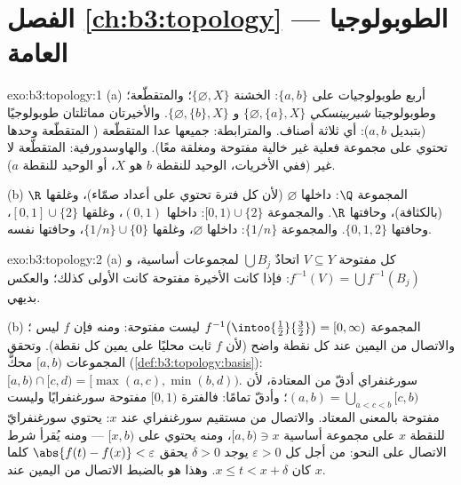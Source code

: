 \section*{الفصل \ref{ch:b3:topology} --- الطوبولوجيا العامة}

\begin{solution}{exo:b3:topology:1}
(a) أربع طوبولوجيات على $\{a,b\}$: الخشنة $\{\varnothing, X\}$؛ والمتقطّعة؛
وطوبولوجيتا \emph{شيربينسكي} $\{\varnothing, \{a\}, X\}$ و $\{\varnothing,
\{b\}, X\}$. والأخيرتان مماثلتان
طوبولوجيًا (بتبديل $a, b$): أي ثلاثة أصناف. والمترابطة: جميعها
عدا المتقطّعة ( المتقطّعة وحدها تحتوي على مجموعة
فعلية غير خالية مفتوحة ومغلقة معًا). والهاوسدورفية: المتقطّعة
لا غير (ففي الأخريات،  الوحيد للنقطة $b$ هو $X$، أو
 الوحيد للنقطة $a$).

(b) المجموعة $\Q$: داخلها $\varnothing$ (لأن كل فترة تحتوي على
أعداد صمّاء)، وغلقها $\R$ (بالكثافة)، وحافتها $\R$. والمجموعة
$[0,1)
\cup \{2\}$: داخلها $(0,1)$، وغلقها $[0,1]\cup\{2\}$، وحافتها
$\{0, 1, 2\}$. والمجموعة $\{1/n\}$: داخلها $\varnothing$،
وغلقها $\{1/n\}\cup\{0\}$، وحافتها  نفسه.
\end{solution}

\begin{solution}{exo:b3:topology:2}
(a) كل مفتوحة $V \subseteq Y$ اتحادٌ $\bigcup B_j$ لمجموعات
أساسية، و $f^{-1}(V) = \bigcup f^{-1}(B_j)$: فإذا كانت الأخيرة مفتوحة كانت الأولى كذلك؛
والعكس بديهي.

(b) المجموعة $f^{-1}\bigl(\intoo{\frac12}{\frac32}\bigr) = [0, \infty)$ ليست مفتوحة: ومنه فإن $f$ ليس ؛
والاتصال من اليمين عند كل نقطة واضح (لأن $f$ ثابت محليًا على
يمين كل نقطة). وتحقق المجموعات $[a, b)$ محكَّ 
(\cref{def:b3:topology:basis}): $[a,b)\cap[c,d) = [\max(a,c),
\min(b,d))$.  سورغنفراي أدقّ من المعتادة،
لأن $(a, b) = \bigcup_{a < c < b}[c, b)$؛ وأدقّ تمامًا: فالفترة $[0,1)$ مفتوحة سورغنفرايًا
وليست مفتوحة بالمعنى المعتاد. والاتصال من مستقيم سورغنفراي عند
$x$: يحتوي  سورغنفرايّ للنقطة $x$ على مجموعة أساسية
$[a, b) \ni x$، ومنه يحتوي على $[x, b)$ --- ومنه يُقرأ شرط
الاتصال على النحو: من أجل كل $\varepsilon > 0$ يوجد $\delta > 0$ يحقق
$\abs{f(t) - f(x)} < \varepsilon$ كلما كان $x \leq t < x + \delta$. وهذا هو بالضبط الاتصال من اليمين عند
$x$.
\end{solution}

